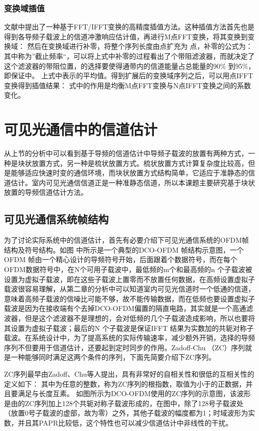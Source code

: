 \subsubsection{变换域插值}
文献中提出了一种基于FFT/IFFT变换的高精度插值方法。这种插值方法首先也是得到各导频子载波上的信道冲激响应估计值，再进行M点FFT变换，将其变换到变换域：
然后在变换域进行补零，将整个序列长度由点扩充为 点，补零的公式为：
其中称为”截止频率“，可以将上式中补零的过程看出了个带阻滤波器，而就决定了这个滤波器的带阻位置，的选择要使得通带内的信道能量占总能量的90\% 到95\%，即保证中。
上式中表示的平均值。得到扩展后的变换域序列之后，可以用点IFFT变换得到插值结果：
式中的作用是均衡M点FFT变换与N点IFFT变换之间的系数变化。
\section{可见光通信中的信道估计}
\label{section:Channel_Estimation}
从上节的分析中可以看到基于导频的信道估计中导频子载波的放置有两种方式，一种是块状放置方式，另一种是梳状放置方式。梳状放置方式计算复杂度比较高，但是能够适应快速时变的通信环境，而块状放置方式结构简单，它适应于准静态的信道估计。室内可见光通信信道正是一种准静态信道，所以本课题主要研究基于块状放置的导频信道估计方法。
\subsection{可见光通信系统帧结构}
为了讨论实际系统中的信道估计，首先有必要介绍下可见光通信系统的OFDM帧结构及符号结构。如图 中所示是一个典型的DCO-OFDM 帧结构示意图，一个OFDM 帧由一个精心设计的导频符号开始，后面跟着个数据符号，而在每个OFDM数据符号中，在N个可用子载波中，最低频的m个和最高频的n 个子载波被设置为虚拟子载波，即在这些子载波上置零而不放置任何数据，在高频设置虚拟子载波很容易理解，从第二章的分析中可以知道室内可见光信道时一个低通的信道，意味着高频子载波的信噪比可能不够，故不能传输数据，而在低频也要设置虚拟子载波是因为在接收端有个去掉DCO-OFDM偏置的隔直电路，其实就是一个高通滤波器，但是这个滤波器不是理想的，会对低频的几个子载波造成影响，所以也要将其设置为虚拟子载波；最后的N 个子载波是保证IFFT 结果为实数加的共轭对称子载波。在系统设计中，为了提高系统的实际传输速率，减少额外开销，选择的导频序列不但要用于信道估计，还要起到定时同步的作用。Zadoff-Chu （ZC）序列就是一种能够同时满足这两个条件的序列，下面先简要介绍下ZC序列。

ZC序列最早由Zadoff、Chu等人提出，具有非常好的自相关性和很低的互相关性的定义如下：
其中为任意的整数，称为ZC序列的根指数，取值为小于的正数据，并且要满足与长度互素。
如图所示为DCO-OFDM使用的ZC序列的示意图，该波形是由的ZC序列加上128个共轭对称子载波形成的，在图中，除了128号子载波处（放置0号子载波的虚部，故为零）之外，其他子载波的幅度都为1；时域波形为实数，并且其PAPR比较低，这个特性也可以减少信道估计中非线性的干扰。
